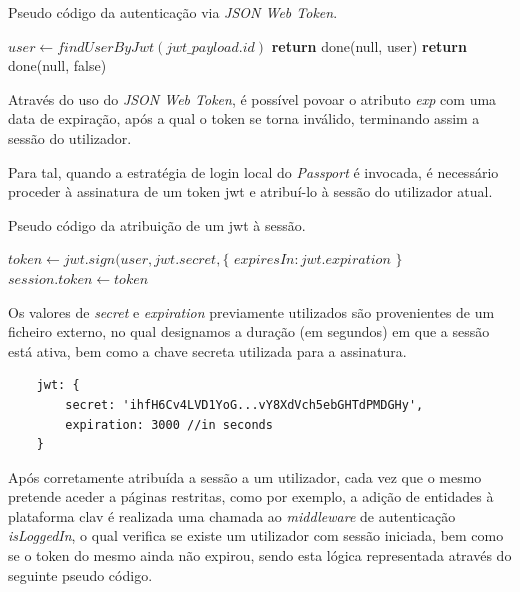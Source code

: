 \begin{algorithm}
    \caption{Pseudo código da autenticação via \emph{JSON Web Token}.}
    \begin{algorithmic}[1]
        \State $user \gets findUserByJwt(jwt\_payload.id)$
            \State \textbf{return} done(null, user)
        \Else
            \State \textbf{return} done(null, false)
        \EndIf
    \EndFunction
    \end{algorithmic}
\end{algorithm}

Através do uso do \emph{JSON Web Token}, é possível povoar o atributo \emph{exp} com uma data de expiração, após a qual o token se torna inválido, terminando assim a sessão do utilizador.

Para tal, quando a estratégia de login local do \emph{Passport} é invocada, é necessário proceder à assinatura de um token \gls{jwt} e atribuí-lo à sessão do utilizador atual.

\begin{algorithm}
    \caption{Pseudo código da atribuição de um \gls{jwt} à sessão.}
    \label{algoritmoJWT1}
    \begin{algorithmic}[1]
        \State $token \gets jwt.sign({user}, jwt.secret, \{$
        \State \indent $expiresIn : jwt.expiration$
        \State $\}$
        \State $session.token \gets token$
    \EndFunction
    \end{algorithmic}
\end{algorithm}

Os valores de \emph{secret} e \emph{expiration} previamente utilizados são provenientes de um ficheiro externo, no qual designamos a duração (em segundos) em que a sessão está ativa, bem como a chave secreta utilizada para a assinatura.

\begin{verbatim}
    jwt: {
        secret: 'ihfH6Cv4LVD1YoG...vY8XdVch5ebGHTdPMDGHy',
        expiration: 3000 //in seconds
    }
\end{verbatim}

Após corretamente atribuída a sessão a um utilizador, cada vez que o mesmo pretende aceder a páginas restritas, como por exemplo, a adição de entidades à plataforma \gls{clav} é realizada uma chamada ao \emph{middleware} de autenticação \emph{isLoggedIn}, o qual verifica se existe um utilizador com sessão iniciada, bem como se o token do mesmo ainda não expirou, sendo esta lógica representada através do seguinte pseudo código.

